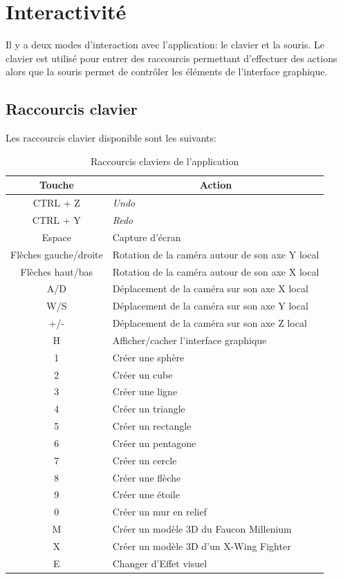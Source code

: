 \section{Interactivité}
\label{s:interactivité}

Il y a deux modes d'interaction avec l'application: le clavier et la souris.
Le clavier est utilisé pour entrer des raccourcis permettant d'effectuer des actions alors que la souris permet de contrôler les éléments de l'interface graphique.

\subsection{Raccourcis clavier}
Les raccourcis clavier disponible sont les suivants:

\begin{table}[h]
    \begin{center}
    \begin{tabular}{|c|l|}
        \hline
        \multicolumn{1}{|c|}{Touche} & \multicolumn{1}{c|}{Action}\\
        \hline
        CTRL + Z & \emph{Undo}\\
        CTRL + Y & \emph{Redo}\\
        Espace & Capture d'écran\\  
        Flèches gauche/droite & Rotation de la caméra autour de son axe Y local\\
        Flèches haut/bas & Rotation de la caméra autour de son axe X local\\
        A/D & Déplacement de la caméra sur son axe X local\\
        W/S & Déplacement de la caméra sur son axe Y local\\
        +/- & Déplacement de la caméra sur son axe Z local\\
        H & Afficher/cacher l'interface graphique\\
        1 & Créer une sphère\\
        2 & Créer un cube\\
        3 & Créer une ligne\\
        4 & Créer un triangle\\
        5 & Créer un rectangle\\
        6 & Créer un pentagone\\
        7 & Créer un cercle\\
        8 & Créer une flèche\\
        9 & Créer une étoile\\
        0 & Créer un mur en relief\\
        M & Créer un modèle 3D du Faucon Millenium\\
        X & Créer un modèle 3D d'un X-Wing Fighter\\
        E & Changer d'Effet visuel \\
        \hline
    \end{tabular}
    \caption{Raccourcis claviers de l'application}
    \end{center}
\end{table}

